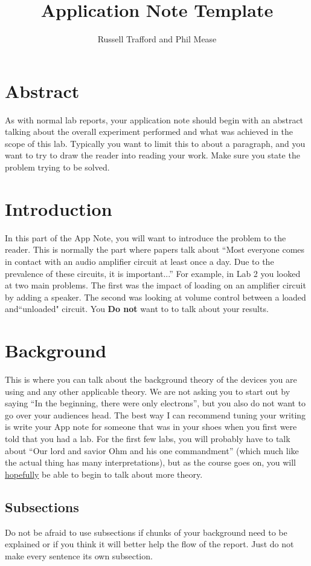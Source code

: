 \documentclass{hitec}
\title{Application Note Template}
\author{Russell Trafford and Phil Mease}
\begin{document}
\maketitle
\section{Abstract}
As with normal lab reports, your application note should begin with an abstract talking about the overall experiment performed and what was achieved in the scope of this lab. Typically you want to limit this to about a paragraph, and you want to try to draw the reader into reading your work. Make sure you state the problem trying to be solved.


\section{Introduction}
In this part of the App Note, you will want to introduce the problem to the reader. This is normally the part where papers talk about ``Most everyone comes in contact with an audio amplifier circuit at least once a day. Due to the prevalence of these circuits, it is important...'' For example, in Lab 2 you looked at two main problems. The first was the impact of loading on an amplifier circuit by adding a speaker. The second was looking at volume control between a loaded and``unloaded" circuit. You \textbf{Do not} want to to talk about your results. 

\section{Background}
This is where you can talk about the background theory of the devices you are using and any other applicable theory. We are not asking you to start out by saying ``In the beginning, there were only electrons'', but you also do not want to go over your audiences head. The best way I can recommend tuning your writing is  write your App note for someone that was in your shoes when you first were told that you had a lab. For the first few labs, you will probably have to talk about ``Our lord and savior Ohm and his one commandment'' (which much like the actual thing has many interpretations), but as the course goes on, you will \underline{hopefully} be able to begin to talk about more theory.
\\
\subsection{Subsections}
Do not be afraid to use subsections if chunks of your background need to be explained or if you think it will better help the flow of the report. Just do not make every sentence its own subsection.
\end{document}
